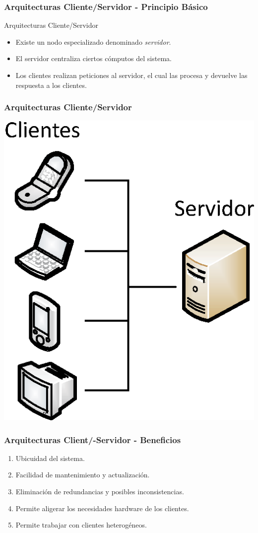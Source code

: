 \documentclass[a4paper,slidestop,xcolor=pst,dvips,blue]{beamer}
\begin{document}
\begin{frame}[c]
    \frametitle{Arquitecturas Cliente/Servidor - Principio Básico}
    \begin{block}{Arquitecturas Cliente/Servidor}
        \begin{itemize}[<+->]
            \item Existe un nodo especializado denominado \emph{servidor}.
            \item El servidor centraliza ciertos cómputos del sistema.
            \item Los clientes realizan peticiones al servidor, el cual las procesa y devuelve las respuesta a los clientes.
        \end{itemize}
    \end{block}
\end{frame}

\begin{frame}[c]
	\frametitle{Arquitecturas Cliente/Servidor}
	\begin{center}
        \includegraphics[width=.5\linewidth,keepaspectratio=true]{images/patterns/clienteServidor.eps}
	\end{center}
\end{frame}

\begin{frame}[c]
    \frametitle{Arquitecturas Client/-Servidor - Beneficios}
    \begin{enumerate}[<+->]
        \item Ubicuidad del sistema.
        \item Facilidad de mantenimiento y actualización.
        \item Eliminación de redundancias y posibles inconsistencias.
        \item Permite aligerar los necesidades hardware de los clientes.
        \item Permite trabajar con clientes heterogéneos.
    \end{enumerate}
\end{frame}
\end{document}

